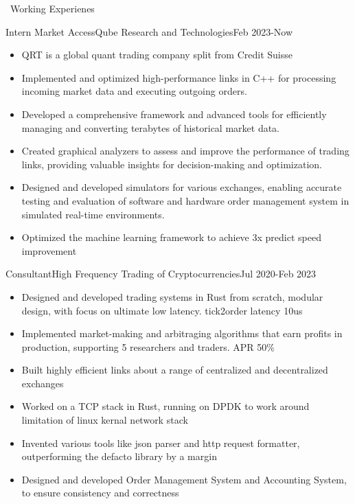 \documentclass{resume}
\begin{document}
\begin{rSection}{\faUsers~Working Experienes}
    \begin{rExperience}{Intern Market Access}{Qube Research and Technologies}{Feb 2023-Now}
        \begin{itemize}
            \itemsep -0.5em \vspace{-0.5em}
            \item QRT is a global quant trading company split from Credit Suisse
            \item Implemented and optimized high-performance links in C++ for processing incoming market data and executing outgoing orders.
            \item Developed a comprehensive framework and advanced tools for efficiently managing and converting terabytes of historical market data.
            \item Created graphical analyzers to assess and improve the performance of trading links, providing valuable insights for decision-making and optimization.
            \item Designed and developed simulators for various exchanges, enabling accurate testing and evaluation of software and hardware order management system in simulated real-time environments.
            \item Optimized the machine learning framework to achieve 3x predict speed improvement
        \end{itemize}
    \end{rExperience}

    \begin{rExperience}{Consultant}{High Frequency Trading of Cryptocurrencies}{Jul 2020-Feb 2023}
        \begin{itemize}
            \itemsep -0.5em \vspace{-0.5em}
            \item Designed and developed trading systems in Rust from scratch, modular design, with focus on ultimate low latency. tick2order latency 10us
            \item Implemented market-making and arbitraging algorithms that earn profits in production, supporting 5 researchers and traders. APR 50\%
            \item Built highly efficient links about a range of centralized and decentralized exchanges
            \item Worked on a TCP stack in Rust, running on DPDK to work around limitation of linux kernal network stack
            \item Invented various tools like json parser and http request formatter, outperforming the defacto library by a margin
            \item Designed and developed Order Management System and Accounting System, to ensure consistency and correctness
        \end{itemize}
    \end{rExperience}


\end{rSection}
\end{document}
